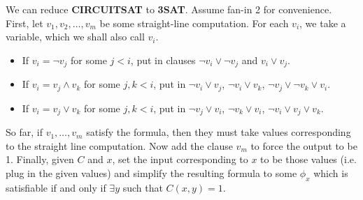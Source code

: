 \documentclass{article}
\theoremstyle{definition}
\begin{document}
We can reduce \textbf{CIRCUITSAT} to \textbf{3SAT}. Assume fan-in 2 for convenience. First, let $v_1,v_2,\ldots,v_m$ be some straight-line computation. For each $v_i$, we take a variable, which we shall also call $v_i$. 
\begin{itemize}
    \item If $v_i = \neg v_j$ for some $j<i$, put in clauses $\neg v_i \vee \neg v_j$ and $v_i \vee v_j$.
    \item If $v_i = v_j \wedge v_k$ for some $j,k <i$, put in $\neg v_i \vee v_j$, $\neg v_i \vee v_k$, $\neg v_j \vee \neg v_k \vee v_i$.
    \item If $v_i = v_j \vee v_k$ for some $j,k < i$, put in $\neg v_j \vee v_i$, $\neg v_k \vee v_i$, $\neg v_i \vee v_j \vee v_k$.
\end{itemize} 
So far, if $v_1,\ldots,v_m$ satisfy the formula, then they must take values corresponding to the straight line computation. Now add the clause $v_m$ to force the output to be 1. Finally, given $C$ and $x$, set the input corresponding to $x$ to be those values (i.e. plug in the given values) and simplify the resulting formula to some $\phi_x$ which is satisfiable if and only if $\exists y$ such that $C(x,y)=1$.
\end{document}
